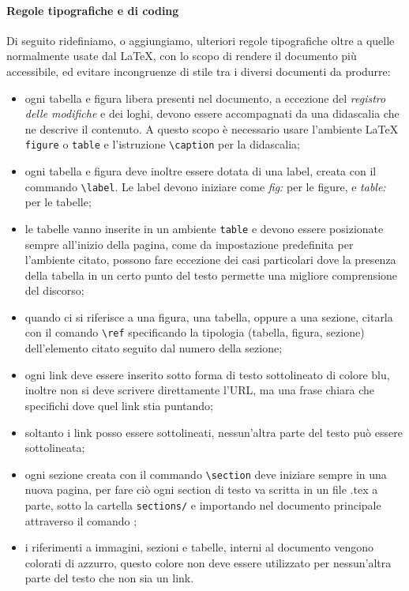         \paragraph{Regole tipografiche e di coding}
            Di seguito ridefiniamo, o aggiungiamo, ulteriori regole tipografiche oltre a quelle normalmente usate dal \LaTeX, con lo scopo di rendere il documento più accessibile, ed evitare incongruenze di stile tra i diversi documenti da produrre:
            \begin{itemize}
                \item ogni tabella e figura libera presenti nel documento, a eccezione del \emph{registro delle modifiche} e dei loghi, devono essere accompagnati da una didascalia che ne descrive il contenuto. A questo scopo è necessario usare l'ambiente LaTeX \verb|figure| o \verb|table| e l'istruzione \verb|\caption| per la didascalia;
                \item ogni tabella e figura deve inoltre essere dotata di una label, creata con il commando \verb|\label|. Le label devono iniziare come \emph{fig:} per le figure, e \emph{table:} per le tabelle;
                \item le tabelle vanno inserite in un ambiente \verb|table| e devono essere posizionate sempre all'inizio della pagina, come da impostazione predefinita per l'ambiente citato, possono fare eccezione dei casi particolari dove la presenza della tabella in un certo punto del testo permette una migliore comprensione del discorso;
                \item quando ci si riferisce a una figura, una tabella, oppure a una sezione, citarla con il comando \verb|\ref| specificando la tipologia (tabella, figura, sezione) dell'elemento citato seguito dal numero della sezione;
                \item ogni link deve essere inserito sotto forma di testo sottolineato di colore blu, inoltre non si deve scrivere direttamente l'URL, ma una frase chiara che specifichi dove quel link stia puntando;
                \item soltanto i link posso essere sottolineati, nessun'altra parte del testo può essere sottolineata;
                \item ogni sezione creata con il commando \verb|\section| deve iniziare sempre in una nuova pagina, per fare ciò ogni section di testo va scritta in un file .tex a parte, sotto la cartella \verb|sections/| e importando nel documento principale attraverso il comando \verb||;
                \item i riferimenti a immagini, sezioni e tabelle, interni al documento vengono colorati di azzurro, questo colore non deve essere utilizzato per nessun'altra parte del testo che non sia un link.
            \end{itemize}

